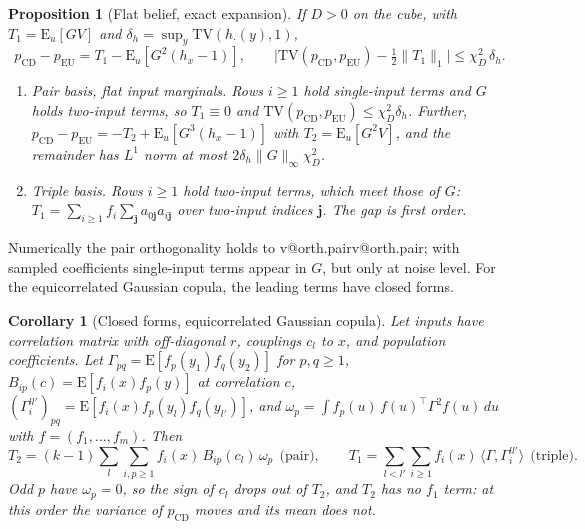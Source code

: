 \documentclass[10pt,a4paper]{article}
\makeatletter
\newcommand{\V}[1]{\ifcsname v@#1\endcsname\csname v@#1\endcsname\else\errmessage{unknown number #1}\fi}
\newcommand{\pcd}{p_{\mathrm{CD}}}
\newcommand{\peu}{p_{\mathrm{EU}}}
\newcommand{\Eu}{\mathrm{E}_u}
\newcommand{\TV}{\mathrm{TV}}
\theoremstyle{upright}
\newtheorem{proposition}[theorem]{Proposition}
\newtheorem{corollary}[theorem]{Corollary}
\makeatother
\begin{document}
\begin{proposition}[Flat belief, exact expansion]\label{prop:flat}
If $D>0$ on the cube, with $T_1=\Eu[GV]$ and $\delta_h=\sup_y\TV(h_\cdot(y),1)$,
\begin{equation}\label{eq:flat}
\pcd-\peu=T_1-\Eu[G^2(h_x-1)],\qquad\big|\TV(\pcd,\peu)-\tfrac12\|T_1\|_1\big|\leq\chi_D^2\,\delta_h.
\end{equation}
\begin{enumerate}[label=(\alph*)]
\item \emph{Pair basis, flat input marginals.} Rows $i\geq1$ hold single-input terms and $G$ holds two-input terms, so $T_1\equiv0$ and $\TV(\pcd,\peu)\leq\chi_D^2\delta_h$. Further, $\pcd-\peu=-T_2+\Eu[G^3(h_x-1)]$ with $T_2=\Eu[G^2V]$, and the remainder has $L^1$ norm at most $2\delta_h\|G\|_\infty\chi_D^2$.
\item \emph{Triple basis.} Rows $i\geq1$ hold two-input terms, which meet those of $G$: $T_1=\sum_{i\geq1}f_i\sum_{\mathbf{j}}a_{0\mathbf{j}}a_{i\mathbf{j}}$ over two-input indices $\mathbf{j}$. The gap is first order.
\end{enumerate}
\end{proposition}

Numerically the pair orthogonality holds to \V{orth.pair}; with sampled coefficients single-input terms appear in $G$, but only at noise level. For the equicorrelated Gaussian copula, the leading terms have closed forms.

\begin{corollary}[Closed forms, equicorrelated Gaussian copula]\label{cor:closed}
Let inputs have correlation matrix with off-diagonal $r$, couplings $c_l$ to $x$, and population coefficients. Let $\Gamma_{pq}=\mathrm{E}[f_p(y_1)f_q(y_2)]$ for $p,q\geq1$, $B_{ip}(c)=\mathrm{E}[f_i(x)f_p(y)]$ at correlation $c$, $(\Gamma^{ll'}_{i})_{pq}=\mathrm{E}[f_i(x)f_p(y_l)f_q(y_{l'})]$, and $\omega_p=\int f_p(u)\,f(u)^\top \Gamma^2f(u)\,du$ with $f=(f_1,\dots,f_m)$. Then
\begin{equation}\label{eq:closed}
T_2=(k-1)\sum_{l}\sum_{i,p\geq1}f_i(x)\,B_{ip}(c_l)\,\omega_p\ \ \text{(pair)},\qquad
T_1=\sum_{l<l'}\sum_{i\geq1}f_i(x)\,\langle \Gamma,\Gamma_i^{ll'}\rangle\ \ \text{(triple)}.
\end{equation}
Odd $p$ have $\omega_p=0$, so the sign of $c_l$ drops out of $T_2$, and $T_2$ has no $f_1$ term: at this order the variance of $\pcd$ moves and its mean does not.
\end{corollary}
\end{document}
